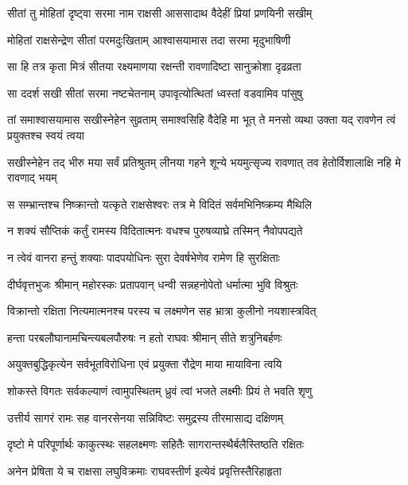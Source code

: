 
\twolineshloka
{सीतां तु मोहितां दृष्ट्वा सरमा नाम राक्षसी}
{आससादाथ वैदेहीं प्रियां प्रणयिनी सखीम्} %

\twolineshloka
{मोहितां राक्षसेन्द्रेण सीतां परमदुःखिताम्}
{आश्वासयामास तदा सरमा मृदुभाषिणी} %

\twolineshloka
{सा हि तत्र कृता मित्रं सीतया रक्ष्यमाणया}
{रक्षन्ती रावणादिष्टा सानुक्रोशा दृढव्रता} %

\twolineshloka
{सा ददर्श सखी सीतां सरमा नष्टचेतनाम्}
{उपावृत्योत्थितां ध्वस्तां वडवामिव पांसुषु} %

\threelineshloka
{तां समाश्वासयामास सखीस्नेहेन सुव्रताम्}
{समाश्वसिहि वैदेहि मा भूत् ते मनसो व्यथा}
{उक्ता यद् रावणेन त्वं प्रयुक्तश्च स्वयं त्वया} %

\threelineshloka
{सखीस्नेहेन तद् भीरु मया सर्वं प्रतिश्रुतम्}
{लीनया गहने शून्ये भयमुत्सृज्य रावणात्}
{तव हेतोर्विशालाक्षि नहि मे रावणाद् भयम्} %

\twolineshloka
{स सम्भ्रान्तश्च निष्क्रान्तो यत्कृते राक्षसेश्वरः}
{तत्र मे विदितं सर्वमभिनिष्क्रम्य मैथिलि} %

\twolineshloka
{न शक्यं सौप्तिकं कर्तुं रामस्य विदितात्मनः}
{वधश्च पुरुषव्याघ्रे तस्मिन् नैवोपपद्यते} %

\twolineshloka
{न त्वेवं वानरा हन्तुं शक्याः पादपयोधिनः}
{सुरा देवर्षभेणेव रामेण हि सुरक्षिताः} %

\twolineshloka
{दीर्घवृत्तभुजः श्रीमान् महोरस्कः प्रतापवान्}
{धन्वी सन्नहनोपेतो धर्मात्मा भुवि विश्रुतः} %

\twolineshloka
{विक्रान्तो रक्षिता नित्यमात्मनश्च परस्य च}
{लक्ष्मणेन सह भ्रात्रा कुलीनो नयशास्त्रवित्} %

\twolineshloka
{हन्ता परबलौघानामचिन्त्यबलपौरुषः}
{न हतो राघवः श्रीमान् सीते शत्रुनिबर्हणः} %

\twolineshloka
{अयुक्तबुद्धिकृत्येन सर्वभूतविरोधिना}
{एवं प्रयुक्ता रौद्रेण माया मायाविना त्वयि} %

\twolineshloka
{शोकस्ते विगतः सर्वकल्याणं त्वामुपस्थितम्}
{ध्रुवं त्वां भजते लक्ष्मीः प्रियं ते भवति शृणु} %

\twolineshloka
{उत्तीर्य सागरं रामः सह वानरसेनया}
{सन्निविष्टः समुद्रस्य तीरमासाद्य दक्षिणम्} %

\twolineshloka
{दृष्टो मे परिपूर्णार्थः काकुत्स्थः सहलक्ष्मणः}
{सहितैः सागरान्तस्थैर्बलैस्तिष्ठति रक्षितः} %

\twolineshloka
{अनेन प्रेषिता ये च राक्षसा लघुविक्रमाः}
{राघवस्तीर्ण इत्येवं प्रवृत्तिस्तैरिहाहृता} %

